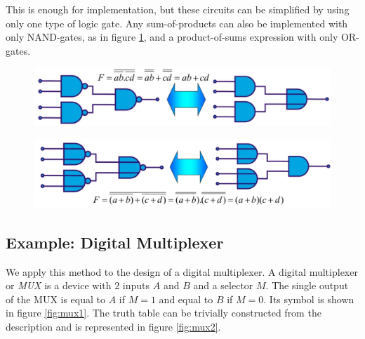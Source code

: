 This is enough for implementation, but these circuits can be simplified by using only one type of logic gate. Any sum-of-products can also be implemented with only NAND-gates, as in figure \ref{fig:combinatorial3}, and a product-of-sums expression with only OR-gates.

\begin{figure}[h!]
	\centering
	\includegraphics[width=12cm]{figures/ch13/combinatorial3.jpg}
	\caption{}
	\label{fig:combinatorial3}
\end{figure}

\begin{figure}[h!]
	\centering
	\includegraphics[width=12cm]{figures/ch13/combinatorial4.jpg}
	\caption{}
	\label{fig:combinatorial4}
\end{figure}


\subsection{Example: Digital Multiplexer}
\label{sec:multiplexer}
We apply this method to the design of a digital multiplexer. A digital multiplexer or \emph{MUX} is a device with $2$ inputs $A$ and $B$ and a selector $M$. The single output of the MUX is equal to $A$ if $M = 1$ and equal to $B$ if $M=0$. Its symbol is shown in figure \ref{fig:mux1}. The truth table can be trivially constructed from the description  and is represented in figure \ref{fig:mux2}. 

